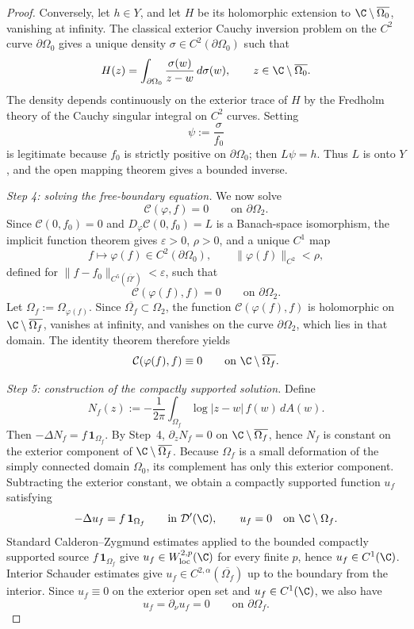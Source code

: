 \begin{proof}
Conversely, let \(h\in Y\), and let \(H\) be its holomorphic extension to
\(\C\setminus\overline{\Omega_0}\), vanishing at infinity. The classical
exterior Cauchy inversion problem on the \(C^2\) curve \(\partial\Omega_0\)
gives a unique density \(\sigma\in C^2(\partial\Omega_0)\) such that
\[
H(z)=\int_{\partial\Omega_0}\frac{\sigma(w)}{z-w}\,d\sigma(w),
\qquad z\in\C\setminus\overline{\Omega_0}.
\]
The density depends continuously on the exterior trace of \(H\) by the
Fredholm theory of the Cauchy singular integral on \(C^2\) curves. Setting
\[
\psi:=\frac{\sigma}{f_0}
\]
is legitimate because \(f_0\) is strictly positive on \(\partial\Omega_0\);
then \(L\psi=h\). Thus \(L\) is onto \(Y\), and the open mapping theorem gives
a bounded inverse.

\medskip
\noindent\emph{Step 4: solving the free-boundary equation.}
We now solve
\[
\mathcal C(\varphi,f)=0
\qquad\text{on }\partial\Omega_2 .
\]
Since \(\mathcal C(0,f_0)=0\) and
\(D_\varphi\mathcal C(0,f_0)=L\) is a Banach-space isomorphism, the implicit
function theorem gives \(\varepsilon>0\), \(\rho>0\), and a unique \(C^1\) map
\[
f\mapsto\varphi(f)\in C^2(\partial\Omega_0),
\qquad
\|\varphi(f)\|_{C^2}<\rho,
\]
defined for \(\|f-f_0\|_{C^5(\overline{\Omega'})}<\varepsilon\), such that
\[
\mathcal C(\varphi(f),f)=0
\qquad\text{on }\partial\Omega_2 .
\]
Let \(\Omega_f:=\Omega_{\varphi(f)}\). Since
\(\overline{\Omega_f}\subset\Omega_2\), the function
\(\mathcal C(\varphi(f),f)\) is holomorphic on
\(\C\setminus\overline{\Omega_f}\), vanishes at infinity, and vanishes on the
curve \(\partial\Omega_2\), which lies in that domain. The identity theorem
therefore yields
\[
\mathcal C(\varphi(f),f)\equiv0
\qquad\text{on }\C\setminus\overline{\Omega_f}.
\]

\medskip
\noindent\emph{Step 5: construction of the compactly supported solution.}
Define
\[
N_f(z):=
-\frac1{2\pi}\int_{\Omega_f}\log|z-w|\,f(w)\,dA(w).
\]
Then \(-\Delta N_f=f\,\mathbf 1_{\Omega_f}\). By Step~4,
\(\partial_zN_f=0\) on \(\C\setminus\overline{\Omega_f}\), hence \(N_f\) is
constant on the exterior component of \(\C\setminus\overline{\Omega_f}\).
Because \(\Omega_f\) is a small deformation of the simply connected domain
\(\Omega_0\), its complement has only this exterior component. Subtracting the
exterior constant, we obtain a compactly supported function \(u_f\) satisfying
\[
-\Delta u_f=f\,\mathbf 1_{\Omega_f}
\qquad\text{in }\mathcal D'(\C),
\qquad
u_f=0\quad\text{on }\C\setminus\Omega_f .
\]
Standard Calderon--Zygmund estimates applied to the bounded compactly
supported source \(f\,\mathbf 1_{\Omega_f}\) give
\(u_f\in W^{2,p}_{\mathrm{loc}}(\C)\) for every finite \(p\), hence
\(u_f\in C^1(\C)\). Interior Schauder estimates give
\(u_f\in C^{2,\alpha}(\overline{\Omega_f})\) up to the boundary from the
interior. Since \(u_f\equiv0\) on the exterior open set and \(u_f\in C^1(\C)\),
we also have
\[
u_f=\partial_\nu u_f=0
\qquad\text{on }\partial\Omega_f .
\]


\end{proof}

